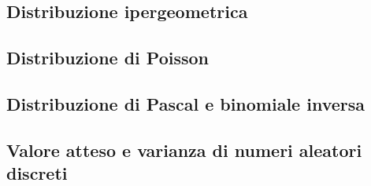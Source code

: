\documentclass{subfiles}
\begin{document}
\subsection{Distribuzione ipergeometrica}


\subsection{Distribuzione di Poisson}


\subsection{Distribuzione di Pascal e binomiale inversa}


\subsection{Valore atteso e varianza di numeri aleatori discreti}

\end{document}
